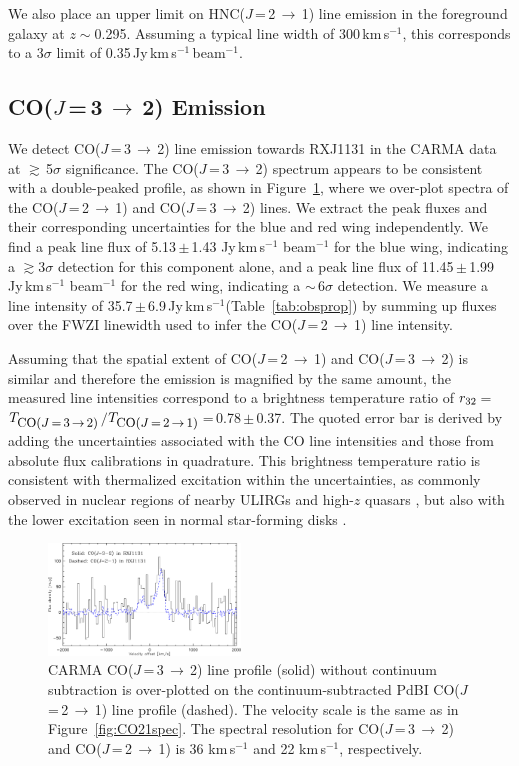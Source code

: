 \documentclass[]{emulateapj}
\newcommand{\rarr}{$\rightarrow$}
\newcommand{\bco}{\mbox{CO($J$\,=\,2\,\rarr\,1)}\xspace}
\newcommand{\cco}{\mbox{CO($J$\,=\,3\,\rarr\,2)}\xspace}
\newcommand{\rot}[3][CO]{\mbox{#1($J$\,=\,#2\,\rarr\,#3)}}
\newcommand{\kms}{\mbox{km\,s$^{-1}$}\xspace}
\newcommand{\pmOne}{\mbox{$^{-1}$}\xspace}
\newcommand{\pmm}{\,$\pm$\,}
\newcommand{\Fig}[1]{Figure~\ref{fig:#1}}
\newcommand{\Tab}[1]{Table~\ref{tab:#1}}
\begin{document}
We also place an upper limit on \rot[HNC]{2}{1} line emission
in the foreground galaxy at $z\sim$0.295.
Assuming a typical line width of 300\,\kms, this corresponds to a 3$\sigma$
limit of 0.35\,Jy\,\kms\,beam\pmOne.

\subsection{\cco Emission}
We detect \cco line emission towards RXJ1131 in the CARMA data at $\gtrsim$\,5$\sigma$ significance.
The \cco spectrum appears to be consistent with a double-peaked profile, as shown in \Fig{co32spec}, where
we over-plot spectra of the \bco and \cco lines.
We extract the peak fluxes and their corresponding uncertainties for the blue and red wing independently.
We find a peak line flux of 5.13\pmm1.43 Jy\,\kms beam\pmOne for the blue wing, indicating a $\gtrsim$3$\sigma$ detection for this component alone, and a peak line flux of 11.45\pmm1.99\,Jy\,\kms beam\pmOne for the red wing,
indicating a $\sim$\,6$\sigma$ detection.
We measure a line intensity of 35.7\,$\pm$\,6.9\,Jy\,\kms (\Tab{obsprop}) by summing up fluxes over the FWZI
linewidth used to infer the \bco line intensity.

Assuming that the spatial extent of \bco and \cco is similar and therefore the emission is
magnified by the same amount, the measured line intensities
correspond to a brightness temperature ratio of
$r_{\rm 32}$\,=\,$T_{\small \cco}$$/$$T_{\small \bco}$\,=\,0.78\,$\pm$\,0.37.
The quoted error bar is derived by adding the uncertainties associated with the CO line intensities
and those from absolute flux calibrations in quadrature.
This brightness temperature ratio is consistent with
thermalized excitation within the uncertainties, as commonly observed in nuclear regions of
nearby ULIRGs and high-$z$ quasars \citep[e.g.,][]{Weiss07a, Riechers11b, CW13}, but also
with the lower excitation seen in normal star-forming disks \citep[e.g.,][]{Dannerbauer09a, CW13, Daddi15a}.

\begin{figure}[!htbp]
\includegraphics[width=0.455\textwidth]{f3.pdf}
\caption{CARMA \cco line profile (solid) without continuum subtraction is
over-plotted on the continuum-subtracted PdBI \bco line profile (dashed).
The velocity scale is the same as in \Fig{CO21spec}.
The spectral resolution for \cco and \bco
is 36 \kms and 22 \kms, respectively.
\label{fig:co32spec}}
\end{figure}
\end{document}
